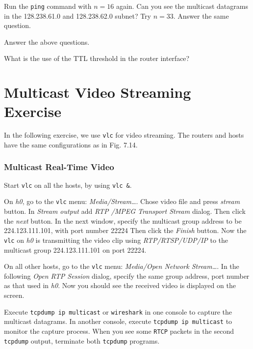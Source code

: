 \documentclass{../UTNetLab}
\begin{document}
    Run the \lstinline{ping} command with $n = 16$ again.
    Can you see the multicast datagrams in the 128.238.61.0 and 128.238.62.0 subnet?
    Try $n = 33$.
    Answer the same question.
    
    \begin{report}
    \item Answer the above questions. 
    
    \item What is the use of the TTL threshold in the router interface?
    \end{report}

\part{Multicast Video Streaming Exercise}
    In the following exercise, we use \lstinline{vlc} for video streaming.
    The routers and hosts have the same configurations as in Fig. 7.14.

\section{Multicast Real-Time Video}
    Start \lstinline{vlc} on all the hosts, by using \lstinline{vlc &}. 

    On \textit{h0}, go to the \lstinline{vlc} menu: \textit{Media/Stream\ldots }. Chose video file  and press \textit{stream} button. In \textit{Stream output} add \textit{RTP /MPEG Transport Stream} dialog.
    Then click the \textit{next} button.
    In the next window, specify the multicast group address to be {224.123.111.101}, with port number {22224} %
    Then click the \textit{Finish} button.
    Now the \lstinline{vlc} on \textit{h0} is transmitting the video clip using \textit{RTP/RTSP/UDP/IP} to the multicast group {224.123.111.101} on port {22224}. 

    On all other hosts, go to the \lstinline{vlc} menu: \textit{Media/Open Network Stream\ldots}. In the following \textit{Open RTP Session} dialog, specify the same group address, port number as that used in \textit{h0}.%
    Now you should see the received video is displayed on the screen. 

    Execute \lstinline{tcpdump ip multicast} or \lstinline{wireshark} in one console to capture the multicast datagrams.
    In another console, execute \lstinline{tcpdump ip multicast} to monitor the capture process.
    When you see some \texttt{RTCP} packets in the second \lstinline{tcpdump} output, terminate both \lstinline{tcpdump} programs. 
\end{document}
